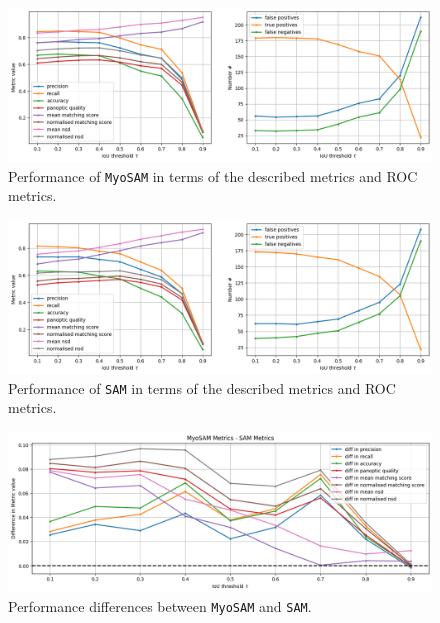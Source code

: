 \begin{figure}
	\centering
	\includegraphics[width=\textwidth]{"images/quantitative_performance_myosam.png"}
	\caption[Quantitative performance \texttt{MyoSAM}]{Performance of \texttt{MyoSAM} in terms of the described metrics and ROC metrics.}
	\label{figperfsam}
\end{figure}
\begin{figure}
	\centering
	\includegraphics[width=\textwidth]{"images/quantitative_performance_sam.png"}
	\caption[Quantitative performance \texttt{SAM}]{Performance of \texttt{SAM} in terms of the described metrics and ROC metrics.}
	\label{figperfsambase}
\end{figure}
\begin{figure}
	\centering
	\includegraphics[width=\textwidth]{"images/diff_quantitative_performance_myosam_sam.png"}
	\caption[Difference quantitative performance \texttt{SAM} and \texttt{MyoSAM}]{Performance differences between \texttt{MyoSAM} and \texttt{SAM}.}
	\label{figperfdiffsam}
\end{figure} 


